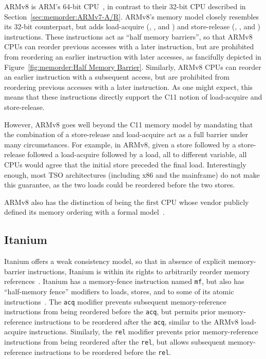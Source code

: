 ARMv8 is ARM's 64-bit CPU~\cite{ARMv8A:2017},
in contrast to their 32-bit CPU described in
Section~\ref{sec:memorder:ARMv7-A/R}.
ARMv8's memory model closely resembles its 32-bit counterpart,
but adds load-acquire (, , and )
and store-release (, , and )
instructions.
These instructions act as ``half memory barriers'', so that
ARMv8 CPUs can reorder previous accesses with a later 
instruction, but are prohibited from reordering an earlier 
instruction with later accesses, as fancifully depicted in
Figure~\ref{fig:memorder:Half Memory Barrier}.
Similarly, ARMv8 CPUs can reorder an earlier  instruction with
a subsequent access, but are prohibited from reordering
previous accesses with a later  instruction.
As one might expect, this means that these instructions directly support
the C11 notion of load-acquire and store-release.

However, ARMv8 goes well beyond the C11 memory model by mandating that
the combination of a store-release and load-acquire act as a full
barrier under many circumstances.
For example, in ARMv8, given a store followed by a store-release followed
a load-acquire followed by a load, all to different variable, all CPUs
would agree that the initial store preceded the final load.
Interestingly enough, most TSO architectures (including x86 and the
mainframe) do not make this guarantee, as the two loads could be
reordered before the two stores.

ARMv8 also has the distinction of being the first CPU whose vendor publicly
defined its memory ordering with a formal model~\cite{ARMv8A:2017}.

\subsection{Itanium}

Itanium offers a weak consistency model, so that in absence of explicit
memory-barrier instructions, Itanium is within its rights to arbitrarily
reorder memory references~\cite{IntelItanium02v2}.
Itanium has a memory-fence instruction named {\tt mf}, but also has
``half-memory fence'' modifiers to loads, stores, and to some of its atomic
instructions~\cite{IntelItanium02v3}.
The {\tt acq} modifier prevents subsequent memory-reference instructions
from being reordered before the {\tt acq}, but permits
prior memory-reference instructions to be reordered after the {\tt acq},
similar to the ARMv8 load-acquire instructions.
Similarly, the {\tt rel} modifier prevents prior memory-reference
instructions from being reordered after the {\tt rel}, but allows
subsequent memory-reference instructions to be reordered before
the {\tt rel}.

